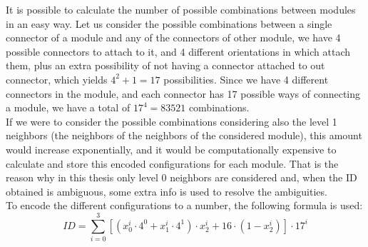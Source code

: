 It is possible to calculate the number of possible combinations between modules in an easy way. Let us consider the possible combinations between a single connector of a module and any of the connectors of other module, we have 4 possible connectors to attach to it, and 4 different orientations in which attach them, plus an extra possibility of not having a connector attached to out connector, which yields $4^2+1 = 17$ possibilities. Since we have 4 different connectors in the module, and each connector has 17 possible ways of connecting a module, we have a total of $17^4 = 83521$ combinations.\\

If we were to consider the possible combinations considering also the level 1 neighbors (the neighbors of the neighbors of the considered module), this amount would increase exponentially, and it would be computationally expensive to calculate and store this encoded configurations for each module. That is the reason why in this thesis only level 0 neighbors are considered and, when the ID obtained is ambiguous, some extra info is used to resolve the ambiguities.\\

To encode the different configurations to a number, the following formula is used:
\begin{equation} \label{eq:ID_calculation}
ID = \sum_{i=0}^{3}{ [( x_0^i \cdot 4^0+ x_1^i \cdot 4^1) \cdot x_2^i + 16 \cdot (1-x_2^i)] \cdot 17^i}
\end{equation}


